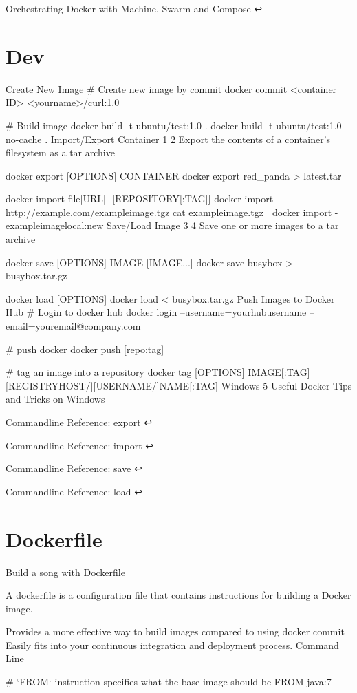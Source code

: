 Orchestrating Docker with Machine, Swarm and Compose ↩

\section{Dev}

Create New Image
# Create new image by commit
docker commit <container ID> <yourname>/curl:1.0

# Build image
docker build -t ubuntu/test:1.0 .
docker build -t ubuntu/test:1.0 --no-cache .
Import/Export Container 1 2
Export the contents of a container's filesystem as a tar archive

docker export [OPTIONS] CONTAINER
docker export red_panda > latest.tar

docker import file|URL|- [REPOSITORY[:TAG]]
docker import http://example.com/exampleimage.tgz
cat exampleimage.tgz | docker import - exampleimagelocal:new
Save/Load Image 3 4
Save one or more images to a tar archive

docker save [OPTIONS] IMAGE [IMAGE...]
docker save busybox > busybox.tar.gz

docker load [OPTIONS]
docker load < busybox.tar.gz
Push Images to Docker Hub
# Login to docker hub
docker login --username=yourhubusername --email=youremail@company.com

# push docker
docker push [repo:tag]

# tag an image into a repository
docker tag [OPTIONS] IMAGE[:TAG] [REGISTRYHOST/][USERNAME/]NAME[:TAG]
Windows
5 Useful Docker Tips and Tricks on Windows

Commandline Reference: export ↩

Commandline Reference: import ↩

Commandline Reference: save ↩

Commandline Reference: load ↩

\section{Dockerfile}

Build a song with Dockerfile

A dockerfile is a configuration file that contains instructions for building a Docker image.

Provides a more effective way to build images compared to using docker commit
Easily fits into your continuous integration and deployment process.
Command Line

# `FROM` instruction specifies what the base image should be
FROM java:7


